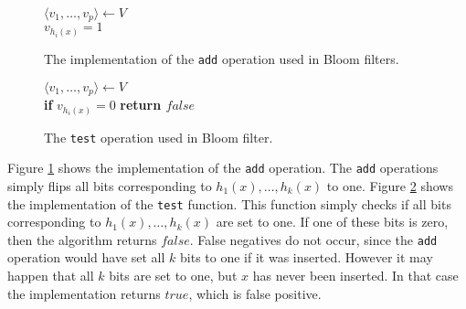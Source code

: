 \begin{figure}
	\centering
	\begin{algorithm}[H]
		\SetStartEndCondition{ }{}{}%
		\AlgoDontDisplayBlockMarkers\SetAlgoNoEnd\SetAlgoNoLine%
		
		 {
			$\langle v_1, \dots, v_p \rangle \gets V$ \\
			 {
				$v_{h_i(x)} = 1$
			}
		}
	\end{algorithm}

	\caption{The implementation of the \texttt{add} operation used in Bloom filters.}
	\label{fig:bloom_add}
\end{figure}

\begin{figure}
	\centering
	\begin{algorithm}[H]
		\SetStartEndCondition{ }{}{}%
		\AlgoDontDisplayBlockMarkers\SetAlgoNoEnd\SetAlgoNoLine%

		 {
			$\langle v_1, \dots, v_p \rangle \gets V$ \\
			 {
				\textbf{if} $v_{h_i(x)} = 0$ \textbf{return $false$}
			}
		}
	\end{algorithm}

	\caption{The \texttt{test} operation used in Bloom filter.}
	\label{fig:bloom_test}
\end{figure}

Figure \ref{fig:bloom_add} shows the implementation of the \texttt{add} operation. The \texttt{add} operations simply flips all bits corresponding to $h_1(x), \dots, h_k(x)$ to one. Figure \ref{fig:bloom_test} shows the implementation of the \texttt{test} function. This function simply checks if all bits corresponding to $h_1(x), \dots, h_k(x)$ are set to one. If one of these bits is zero, then the algorithm returns $false$. False negatives do not occur, since the \texttt{add} operation would have set all $k$ bits to one if it was inserted. However it may happen that all $k$ bits are set to one, but $x$ has never been inserted. In that case the implementation returns $true$, which is false positive.

